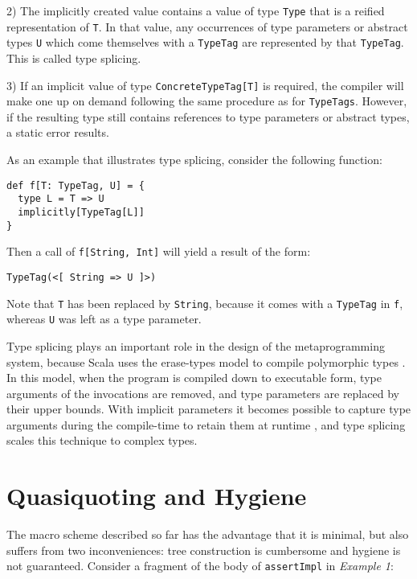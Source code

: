 \documentclass{llncs}
\begin{document}
2) The implicitly created value contains a value of type \lstinline$Type$ that is a reified representation of \lstinline$T$. In that value, any occurrences of type parameters or abstract types \lstinline$U$ which come themselves with a \lstinline$TypeTag$ are represented by that \lstinline$TypeTag$. This is called type splicing.

3) If an implicit value of type \lstinline$ConcreteTypeTag[T]$ is required, the compiler will make one up on demand following the same procedure as for \lstinline$TypeTags$. However, if the resulting type still contains references to type parameters or abstract types, a static error results.

\noindent
As an example that illustrates type splicing, consider the following function:
\noindent

\begin{lstlisting}
def f[T: TypeTag, U] = {
  type L = T => U
  implicitly[TypeTag[L]]
}
\end{lstlisting}

\noindent
Then a call of \lstinline$f[String, Int]$ will yield a result of the form:
\noindent

\begin{lstlisting}
TypeTag(<[ String => U ]>)
\end{lstlisting}

Note that \lstinline$T$ has been replaced by \lstinline$String$, because it comes with a \lstinline$TypeTag$ in \lstinline$f$, whereas \lstinline$U$ was left as a type parameter.

Type splicing plays an important role in the design of the metaprogramming system, because Scala uses the erase-types model to compile polymorphic types \cite{schinz05}. In this model, when the program is compiled down to executable form, type arguments of the invocations are removed, and type parameters are replaced by their upper bounds. With implicit parameters it becomes possible to capture type arguments during the compile-time to retain them at runtime \cite{odersky09}, and type splicing scales this technique to complex types.

\section{Quasiquoting and Hygiene}

The macro scheme described so far has the advantage that it is minimal, but also suffers from two inconveniences: tree construction is cumbersome and hygiene is not guaranteed. Consider a fragment of the body of \lstinline$assertImpl$ in \emph{Example 1}:
\end{document}
